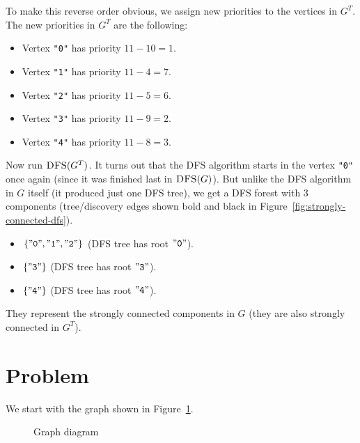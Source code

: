 \documentclass[a4paper,12pt]{article}
\begin{document}
To make this reverse order obvious, we assign new priorities to 
the vertices in $G^T$. The new priorities in $G^T$ are the following:

\begin{itemize}
\item Vertex {\tt "0"} has priority $11 - 10 = 1$.
\item Vertex {\tt "1"} has priority $11 - 4 = 7$. 
\item Vertex {\tt "2"} has priority $11 - 5 = 6$. 
\item Vertex {\tt "3"} has priority $11 - 9 = 2$. 
\item Vertex {\tt "4"} has priority $11 - 8 = 3$. 
\end{itemize}

Now run $\text{\sc DFS}(G^T)$. It turns out that the DFS algorithm starts
in the vertex {\tt "0"} once again (since it was finished last in $\text{\sc DFS}(G)$). 
But unlike the DFS algorithm in $G$ itself (it produced just one DFS tree), 
we get a DFS forest with 3 components (tree/discovery edges shown bold and black in
Figure~\ref{fig:strongly-connected-dfs}). 

\begin{itemize}
\item $\{ \mathtt{"0"}, \mathtt{"1"}, \mathtt{"2"} \}$ (DFS tree has root $\mathtt{"0"}$).
\item $\{ \mathtt{"3"} \}$ (DFS tree has root $\mathtt{"3"}$).
\item $\{ \mathtt{"4"} \}$ (DFS tree has root $\mathtt{"4"}$).
\end{itemize}

They represent the strongly connected components in $G$ (they are also 
strongly connected in $G^T$). 



\section{Problem}

We start with the graph shown in Figure~\ref{fig:problem-graph}.

\begin{figure}[!htb]
\caption{\label{fig:problem-graph} Graph diagram}
\end{figure}
\end{document}
